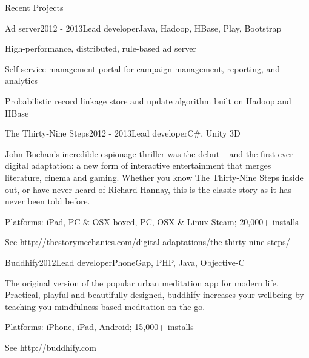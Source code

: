 \documentclass{resume} %
\begin{document}
\pagebreak


\begin{rSection}{Recent Projects}
\begin{rSubsection}{Ad server}{2012 - 2013}{Lead developer}{Java, Hadoop, HBase, Play, Bootstrap}
\item High-performance, distributed, rule-based ad server
\item Self-service management portal for campaign management, reporting, and analytics
\item Probabilistic record linkage store and update algorithm built on Hadoop and HBase
\end{rSubsection}

\begin{rSubsection}{The Thirty-Nine Steps}{2012 - 2013}{Lead developer}{C\#, Unity 3D}
\item John Buchan’s incredible espionage thriller was the debut – and the first ever – digital adaptation: a new form of interactive entertainment that merges literature, cinema and gaming. Whether you know The Thirty-Nine Steps inside out, or have never heard of Richard Hannay, this is the classic story as it has never been told before.
\item Platforms: iPad, PC \& OSX boxed, PC, OSX \& Linux Steam; 20,000+ installs
\item See http://thestorymechanics.com/digital-adaptations/the-thirty-nine-steps/
\end{rSubsection}

\begin{rSubsection}{Buddhify}{2012}{Lead developer}{PhoneGap, PHP, Java, Objective-C}
\item The original version of the popular urban meditation app for modern life. Practical, playful and beautifully-designed, buddhify increases your wellbeing by teaching you mindfulness-based meditation on the go.
\item Platforms: iPhone, iPad, Android; 15,000+ installs
\item See http://buddhify.com
\end{rSubsection}
\end{rSection}

\end{document}
